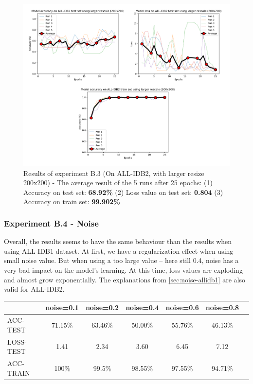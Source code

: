 \documentclass[11pt, openany]{report}
\theoremstyle{plain}
\theoremstyle{definition}
\theoremstyle{remark}
\begin{document}
\begin{figure}[H]
  \centering
  \includegraphics[scale=0.45]{Code/ch6-LeukemiaSubtypes/figures_result/ALL_IDB2/all_idb2-200x200.PNG}
  \caption{Results of experiment B.3 (On ALL-IDB2, with larger resize 200x200) - The average result of the 5 runs after 25 epochs: (1) Accuracy on test set: \textbf{68.92\%} (2) Loss value on test set: \textbf{0.804} (3) Accuracy on train set: \textbf{99.902\%}}
  \label{fig:results-B3}
\end{figure}



\subsubsection{Experiment B.4 - Noise}
Overall, the results seems to have the same behaviour than the results when using ALL-IDB1 dataset. At first, we have a regularization effect when using small noise value. But when using a too large value -- here still 0.4, noise has a very bad impact on the model's learning. At this time, loss values are exploding and almost grow exponentially. The explanations from \autoref{sec:noise-allidb1} are also valid for ALL-IDB2.

\begin{center}
\begin{tabular}{|l|c|c|c|c|c|c|}
  \hline
   & \textbf{noise=0.1} & \textbf{noise=0.2} & \textbf{noise=0.4} & \textbf{noise=0.6} & \textbf{noise=0.8}\\
  \hline
  ACC-TEST & 71.15\% & 63.46\% & 50.00\% & 55.76\% & 46.13\%\\
  LOSS-TEST & 1.41 & 2.34 & 3.60 & 6.45  & 7.12\\ 
  ACC-TRAIN & 100\% & 99.5\% & 98.55\% & 97.55\% & 94.71\% \\ 
  \hline
\end{tabular}
\label{table:results-B4}
\end{center}
\end{document}
